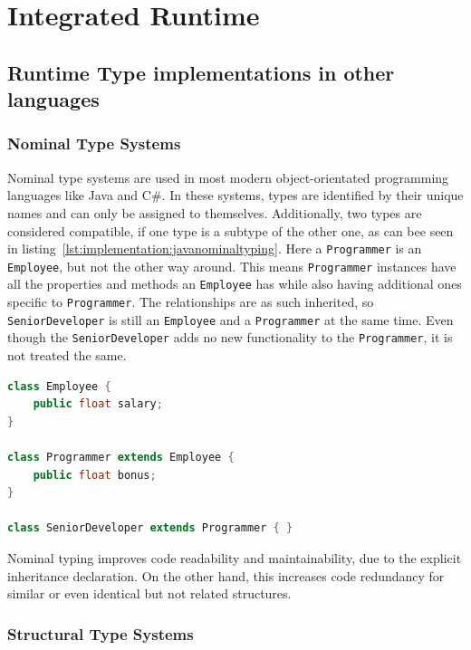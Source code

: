 \section{Integrated Runtime}
\label{sec:integrated-runtime}

\subsection{Runtime Type implementations in other languages}
\label{chap:runtime-other-languages}

\subsubsection{Nominal Type Systems}

Nominal type systems are used in most modern object-orientated programming languages like Java and C\#. In these systems, types are identified by their unique names and can only be assigned to themselves. Additionally, two types are considered compatible, if one type is a subtype of the other one, as can bee seen in listing~\ref{lst:implementation:javanominaltyping}. Here a  \lstinline|Programmer| is an \lstinline|Employee|, but not the other way around. This means \lstinline|Programmer| instances have all the properties and methods an \lstinline|Employee| has while also having additional ones specific to \lstinline|Programmer|. The relationships are as such inherited, so \lstinline|SeniorDeveloper| is still an \lstinline|Employee| and a \lstinline|Programmer| at the same time. Even though the \lstinline|SeniorDeveloper| adds no new functionality to the \lstinline|Programmer|, it is not treated the same. 

\begin{lstlisting}[language=Java,caption=Example of nominal typing in Java,label=lst:implementation:javanominaltyping]
class Employee {
	public float salary;
}

class Programmer extends Employee {
	public float bonus;
}

class SeniorDeveloper extends Programmer { }
\end{lstlisting}

Nominal typing improves code readability and maintainability, due to the explicit inheritance declaration. On the other hand, this increases code redundancy for similar or even identical but not related structures.

\subsubsection{Structural Type Systems}

